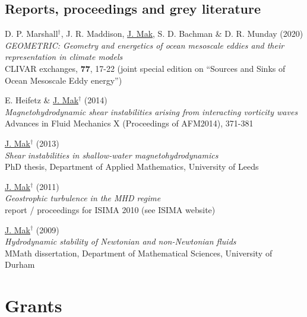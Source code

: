 \documentclass[letterpaper]{article}
\renewenvironment{itemize}{
  \begin{list}{}{
    \setlength{\leftmargin}{1.5em}
  }
}{
  \end{list}
}
\begin{document}
\subsection*{Reports, proceedings and grey literature}
\begin{itemize}

\item[E.] D. P. Marshall$^{\dagger}$, J. R. Maddison, \underline{J. Mak}, S. D. Bachman \& D. R. Munday (2020)\\
\textit{GEOMETRIC: Geometry and energetics of ocean mesoscale eddies and their representation in climate models}\\
CLIVAR exchanges, \textbf{77}, 17-22 (joint special edition on ``Sources and Sinks
of Ocean Mesoscale Eddy energy'')

\item[D.] E. Heifetz \& \underline{J. Mak}$^{\dagger}$ (2014)\\
\textit{Magnetohydrodynamic shear instabilities arising from interacting
vorticity waves}\\
Advances in Fluid Mechanics X (Proceedings of AFM2014), 371-381

\item[C.] \underline{J. Mak}$^{\dagger}$ (2013)\\
\textit{Shear instabilities in shallow-water magnetohydrodynamics}\\
PhD thesis, Department of Applied Mathematics, University of Leeds

\item[B.] \underline{J. Mak}$^{\dagger}$ (2011)\\
\textit{Geostrophic turbulence in the MHD regime}\\
report / proceedings for ISIMA 2010 (see ISIMA website)

\item[A.] \underline{J. Mak}$^{\dagger}$ (2009)\\
\textit{Hydrodynamic stability of Newtonian and non-Newtonian fluids}\\
MMath dissertation, Department of Mathematical Sciences, University of Durham
\end{itemize}

\section*{Grants}
\end{document}
